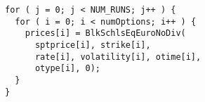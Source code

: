 \begin{lstlisting}[morekeywords={prices}, belowskip=0pt]
for ( j = 0; j < NUM_RUNS; j++ ) {
  for ( i = 0; i < numOptions; i++ ) {
    prices[i] = BlkSchlsEqEuroNoDiv(
      sptprice[i], strike[i],
      rate[i], volatility[i], otime[i],
      otype[i], 0);
  }
}
\end{lstlisting}
